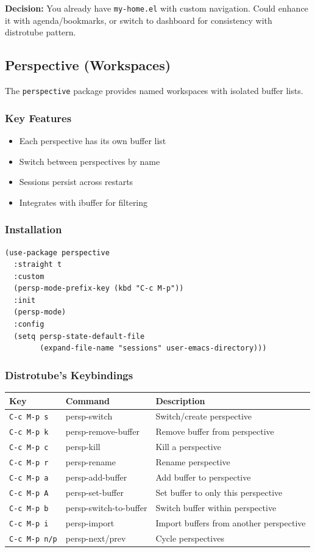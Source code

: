 \documentclass[11pt]{article}
\begin{document}
\textbf{Decision:} You already have \texttt{my-home.el} with custom navigation. Could enhance it with agenda/bookmarks, or switch to dashboard for consistency with distrotube pattern.
\subsection{Perspective (Workspaces)}
\label{sec:org0812d00}

The \texttt{perspective} package provides named workspaces with isolated buffer lists.
\subsubsection{Key Features}
\label{sec:org3cfa988}
\begin{itemize}
\item Each perspective has its own buffer list
\item Switch between perspectives by name
\item Sessions persist across restarts
\item Integrates with ibuffer for filtering
\end{itemize}
\subsubsection{Installation}
\label{sec:orgd0c1300}

\begin{verbatim}
(use-package perspective
  :straight t
  :custom
  (persp-mode-prefix-key (kbd "C-c M-p"))
  :init
  (persp-mode)
  :config
  (setq persp-state-default-file
        (expand-file-name "sessions" user-emacs-directory)))
\end{verbatim}
\subsubsection{Distrotube's Keybindings}
\label{sec:org6e95af6}

\begin{center}
\begin{tabular}{lll}
Key & Command & Description\\
\hline
\texttt{C-c M-p s} & persp-switch & Switch/create perspective\\
\texttt{C-c M-p k} & persp-remove-buffer & Remove buffer from perspective\\
\texttt{C-c M-p c} & persp-kill & Kill a perspective\\
\texttt{C-c M-p r} & persp-rename & Rename perspective\\
\texttt{C-c M-p a} & persp-add-buffer & Add buffer to perspective\\
\texttt{C-c M-p A} & persp-set-buffer & Set buffer to only this perspective\\
\texttt{C-c M-p b} & persp-switch-to-buffer & Switch buffer within perspective\\
\texttt{C-c M-p i} & persp-import & Import buffers from another perspective\\
\texttt{C-c M-p n/p} & persp-next/prev & Cycle perspectives\\
\end{tabular}
\end{center}
\end{document}
